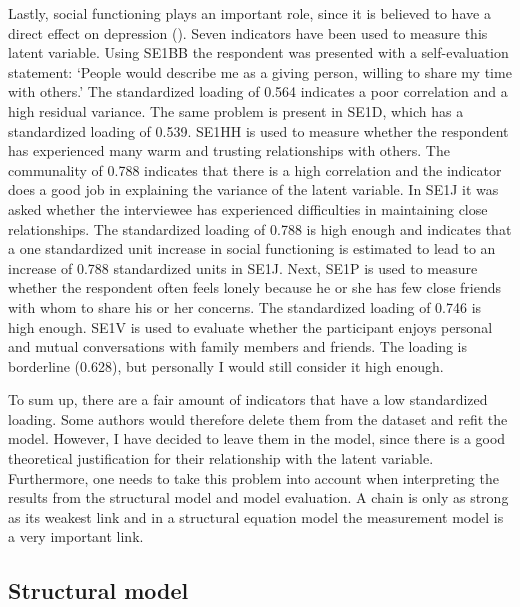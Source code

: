 \documentclass[11pt]{article}
\begin{document}
Lastly, social functioning plays an important role, since it is believed to have
a direct effect on depression (\cite{tse2011}). Seven indicators have been used
to measure this latent variable.
Using SE1BB the respondent was presented with a self-evaluation statement:
`People would describe me as a giving person, willing to share my time with
others.' The standardized loading of 0.564 indicates a poor correlation and a
high residual variance.
The same problem is present in SE1D, which has a standardized loading of 0.539.
SE1HH is used to measure whether the respondent has experienced many warm and
trusting relationships with others. The communality of 0.788 indicates that there
is a high correlation and the indicator does a good job in explaining the variance
of the latent variable.
In SE1J it was asked whether the interviewee has experienced difficulties in
maintaining close relationships. The standardized loading of 0.788 is high enough
and indicates that a one standardized unit increase in social functioning is
estimated to lead to an increase of 0.788 standardized units in SE1J.
Next, SE1P is used to measure whether the respondent often feels lonely because
he or she has few close friends with whom to share his or her concerns. The
standardized loading of 0.746 is high enough.
SE1V is used to evaluate whether the participant enjoys personal and
mutual conversations with family members and friends. The loading is borderline
(0.628), but personally I would still consider it high enough.

To sum up, there are a fair amount of indicators that have a low standardized
loading. Some authors would therefore delete them from the dataset and refit the
model. However, I have decided to leave them in the model, since there is a good
theoretical justification for their relationship with the latent variable.
Furthermore, one needs to take this problem into account when interpreting the
results from the structural model and model evaluation. A chain is only as
strong as its weakest link and in a structural equation model the measurement
model is a very important link.

\FloatBarrier
\subsection{Structural model}
\end{document}
